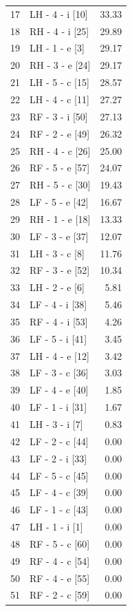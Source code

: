\documentclass[11pt,a4paper]{article}
\begin{document}
\begin{longtable}{@{}rlr@{}}
    17 & LH - 4 - i [10] & 33.33 \\
    18 & RH - 4 - i [25] & 29.89 \\
    19 & LH - 1 - e [3] & 29.17 \\
    20 & RH - 3 - e [24] & 29.17 \\
    21 & LH - 5 - c [15] & 28.57 \\
    22 & LH - 4 - c [11] & 27.27 \\
    23 & RF - 3 - i [50] & 27.13 \\
    24 & RF - 2 - e [49] & 26.32 \\
    25 & RH - 4 - c [26] & 25.00 \\
    26 & RF - 5 - e [57] & 24.07 \\
    27 & RH - 5 - c [30] & 19.43 \\
    28 & LF - 5 - e [42] & 16.67 \\
    29 & RH - 1 - e [18] & 13.33 \\
    30 & LF - 3 - e [37] & 12.07 \\
    31 & LH - 3 - c [8] & 11.76 \\
    32 & RF - 3 - e [52] & 10.34 \\
    33 & LH - 2 - e [6] & 5.81 \\
    34 & LF - 4 - i [38] & 5.46 \\
    35 & RF - 4 - i [53] & 4.26 \\
    36 & LF - 5 - i [41] & 3.45 \\
    37 & LH - 4 - e [12] & 3.42 \\
    38 & LF - 3 - c [36] & 3.03 \\
    39 & LF - 4 - e [40] & 1.85 \\
    40 & LF - 1 - i [31] & 1.67 \\
    41 & LH - 3 - i [7] & 0.83 \\
    42 & LF - 2 - c [44] & 0.00 \\
    43 & LF - 2 - i [33] & 0.00 \\
    44 & LF - 5 - c [45] & 0.00 \\
    45 & LF - 4 - c [39] & 0.00 \\
    46 & LF - 1 - c [43] & 0.00 \\
    47 & LH - 1 - i [1] & 0.00 \\
    48 & RF - 5 - c [60] & 0.00 \\
    49 & RF - 4 - c [54] & 0.00 \\
    50 & RF - 4 - e [55] & 0.00 \\
    51 & RF - 2 - c [59] & 0.00 \\

\end{longtable}
\end{document}
